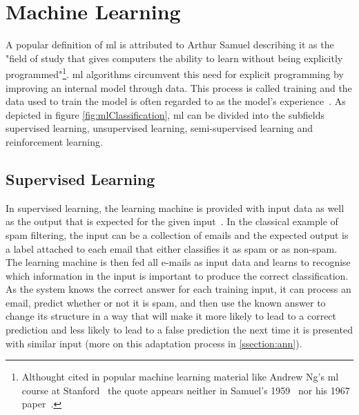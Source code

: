 \documentclass[
			   fontsize=11pt,
               paper=a4,
               bibliography=totoc,
               idxtotoc,
               headsepline,
               footsepline,
               footinclude=false,
               BCOR=12mm,
               DIV=13,
               openany,   %
               ]
               {scrbook}
\begin{document}
\section{Machine Learning}

A popular definition of \acrlong{ml} is attributed to Arthur Samuel describing it as the "field of study that gives computers the ability to learn without being explicitly programmed"\footnote{Althought cited in popular machine learning material like Andrew Ng's \gls{ml} course at Stanford~\cite{mlCourseStan} the quote appears neither in Samuel's 1959~\cite{mlQuote1959} nor his 1967 paper~\cite{mlQuote1967}.}. \acrlong{ml} algorithms circumvent this need for explicit programming by improving an internal model through data. This process is called training and the data used to train the model is often regarded to as the model's experience~\cite{mlMitchell}. As depicted in figure \autoref{fig:mlClassification}, \gls{ml} can be divided into the subfields supervised learning, unsupervised learning, semi-supervised learning and reinforcement learning.

\subsection{Supervised Learning}
In supervised learning, the learning machine is provided with input data as well as the output that is expected for the given input~\cite{introSupervised}. In the classical example of spam filtering, the input can be a collection of emails and the expected output is a label attached to each email that either classifies it as spam or as non-spam. The learning machine is then fed all e-mails as input data and learns to recognise which information in the input is important to produce the correct classification. As the system knows the correct answer for each training input, it can process an email, predict whether or not it is spam, and then use the known answer to change its structure in a way that will make it more likely to lead to a correct prediction and less likely to lead to a false prediction the next time it is presented with similar input (more on this adaptation process in \autoref{ssection:ann}).
\end{document}
